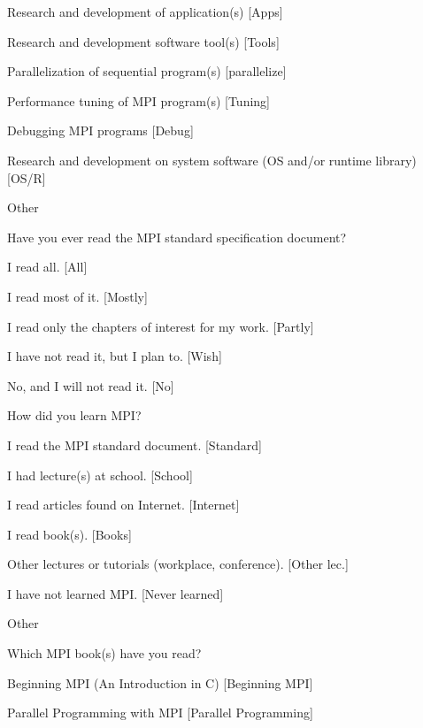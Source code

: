 \documentclass[preprint,5p,times]{elsarticle}
\begin{document}
{{\begin{description}
    \begin{inparaenum}[{\bf C}1)]
    \item Research and development of application(s) [Apps]
    \item Research and development software tool(s) [Tools]
    \item Parallelization of sequential program(s) [parallelize]
    \item Performance tuning of MPI program(s) [Tuning]
    \item Debugging MPI programs [Debug]
    \item Research and development on system software (OS and/or runtime
      library) [OS/R]
    \item Other
    \end{inparaenum}
  \item[Q9:] Have you ever read the MPI standard specification document?
    \begin{inparaenum}[{\bf C}1)]
    \item I read all. [All]
    \item I read most of it. [Mostly]
    \item I read only the chapters of interest for my work. [Partly]
    \item I have not read it, but I plan to. [Wish]
    \item No, and I will not read it. [No]
    \end{inparaenum}
  \item[Q10*:] How did you learn MPI?
    \begin{inparaenum}[{\bf C}1)]
    \item I read the MPI standard document. [Standard]
    \item I had lecture(s) at school. [School]
    \item I read articles found on Internet. [Internet]
    \item I read book(s). [Books]
    \item Other lectures or tutorials (workplace, conference). [Other lec.]
    \item I have not learned MPI. [Never learned]
    \item Other
    \end{inparaenum}
  \item[Q11*:] Which MPI book(s) have you read?
    \begin{inparaenum}[{\bf C}1)]
    \item Beginning MPI (An Introduction in C) [Beginning MPI]
    \item Parallel Programming with MPI [Parallel Programming]

\end{inparaenum}
\end{description}}}
\end{document}
